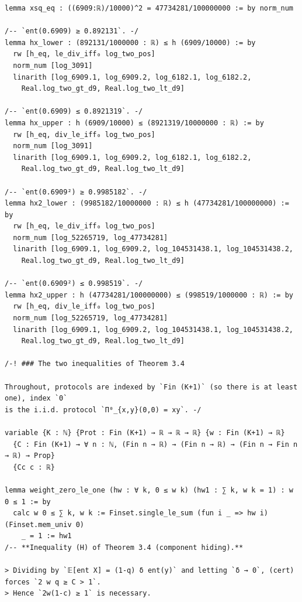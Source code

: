 \documentclass[11pt,a4paper]{article}
\theoremstyle{definition}
\theoremstyle{remark}
\begin{document}
\begin{Verbatim}[fontsize=\scriptsize,formatcom=\leanmono,samepage=false]
lemma xsq_eq : ((6909:ℝ)/10000)^2 = 47734281/100000000 := by norm_num

/-- `ent(0.6909) ≥ 0.892131`. -/
lemma hx_lower : (892131/1000000 : ℝ) ≤ h (6909/10000) := by
  rw [h_eq, le_div_iff₀ log_two_pos]
  norm_num [log_3091]
  linarith [log_6909.1, log_6909.2, log_6182.1, log_6182.2,
    Real.log_two_gt_d9, Real.log_two_lt_d9]

/-- `ent(0.6909) ≤ 0.8921319`. -/
lemma hx_upper : h (6909/10000) ≤ (8921319/10000000 : ℝ) := by
  rw [h_eq, div_le_iff₀ log_two_pos]
  norm_num [log_3091]
  linarith [log_6909.1, log_6909.2, log_6182.1, log_6182.2,
    Real.log_two_gt_d9, Real.log_two_lt_d9]

/-- `ent(0.6909²) ≥ 0.9985182`. -/
lemma hx2_lower : (9985182/10000000 : ℝ) ≤ h (47734281/100000000) := by
  rw [h_eq, le_div_iff₀ log_two_pos]
  norm_num [log_52265719, log_47734281]
  linarith [log_6909.1, log_6909.2, log_104531438.1, log_104531438.2,
    Real.log_two_gt_d9, Real.log_two_lt_d9]

/-- `ent(0.6909²) ≤ 0.998519`. -/
lemma hx2_upper : h (47734281/100000000) ≤ (998519/1000000 : ℝ) := by
  rw [h_eq, div_le_iff₀ log_two_pos]
  norm_num [log_52265719, log_47734281]
  linarith [log_6909.1, log_6909.2, log_104531438.1, log_104531438.2,
    Real.log_two_gt_d9, Real.log_two_lt_d9]

/-! ### The two inequalities of Theorem 3.4

Throughout, protocols are indexed by `Fin (K+1)` (so there is at least one), index `0`
is the i.i.d. protocol `Π⁰_{x,y}(0,0) = xy`. -/

variable {K : ℕ} {Prot : Fin (K+1) → ℝ → ℝ → ℝ} {w : Fin (K+1) → ℝ}
  {C : Fin (K+1) → ∀ n : ℕ, (Fin n → ℝ) → (Fin n → ℝ) → (Fin n → Fin n → ℝ) → Prop}
  {Cc c : ℝ}

lemma weight_zero_le_one (hw : ∀ k, 0 ≤ w k) (hw1 : ∑ k, w k = 1) : w 0 ≤ 1 := by
  calc w 0 ≤ ∑ k, w k := Finset.single_le_sum (fun i _ => hw i) (Finset.mem_univ 0)
    _ = 1 := hw1
/-- **Inequality (H) of Theorem 3.4 (component hiding).**

> Dividing by `𝔼[ent X] = (1-q) δ ent(y)` and letting `δ → 0`, (cert) forces `2 w q ≥ C > 1`.
> Hence `2w(1-c) ≥ 1` is necessary.


\end{Verbatim}
\end{document}
